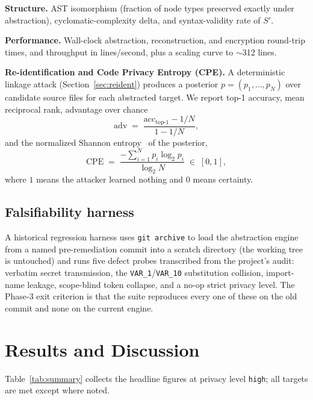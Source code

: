 \documentclass[conference]{IEEEtran}
\begin{document}
\textbf{Structure.} AST isomorphism (fraction of node types preserved
exactly under abstraction), cyclomatic-complexity delta, and
syntax-validity rate of $S'$.

\textbf{Performance.} Wall-clock abstraction, reconstruction, and
encryption round-trip times, and throughput in lines/second, plus a
scaling curve to $\sim$312 lines.

\textbf{Re-identification and Code Privacy Entropy (CPE).} A deterministic
linkage attack (Section~\ref{sec:reident}) produces a posterior
$p = (p_1,\dots,p_N)$ over candidate source files for each abstracted
target. We report top-1 accuracy, mean reciprocal rank, advantage over
chance
\begin{equation}
\mathrm{adv} \;=\; \frac{\text{acc}_{\text{top-1}} - 1/N}{1 - 1/N},
\label{eq:adv}
\end{equation}
and the normalized Shannon entropy~\cite{shannon1948mathematical} of the
posterior,
\begin{equation}
\mathrm{CPE} \;=\; \frac{-\sum_{i=1}^{N} p_i \log_2 p_i}{\log_2 N}
\;\in\; [0,1],
\label{eq:cpe}
\end{equation}
where $1$ means the attacker learned nothing and $0$ means certainty.

\subsection{Falsifiability harness}

A historical regression harness uses \texttt{git archive} to load the
abstraction engine from a named pre-remediation commit into a scratch
directory (the working tree is untouched) and runs five defect probes
transcribed from the project's audit: verbatim secret transmission, the
\texttt{VAR\_1}/\texttt{VAR\_10} substitution collision, import-name
leakage, scope-blind token collapse, and a no-op strict privacy level. The
Phase-3 exit criterion is that the suite reproduces every one of these on
the old commit and none on the current engine.

\section{Results and Discussion}
\label{sec:results}

Table~\ref{tab:summary} collects the headline figures at privacy level
\texttt{high}; all targets are met except where noted.
\end{document}
